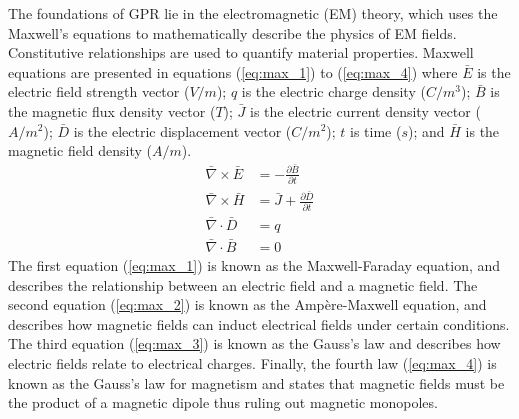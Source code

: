\documentclass{article}
\begin{document}
The foundations of GPR lie in the electromagnetic (EM) theory, which uses the Maxwell's equations to mathematically describe the physics of EM fields. Constitutive relationships are used to quantify material properties. Maxwell equations are presented in equations (\ref{eq:max_1}) to (\ref{eq:max_4}) where $\bar{E}$ is the electric field strength vector ($V/m$); $q$ is the electric charge density ($C/m^{3}$); $\bar{B}$ is the magnetic flux density vector ($T$); $\bar{J}$ is the electric current density vector ($A/m^{2}$); $\bar{D}$ is the electric displacement vector ($C/m^{2}$); $t$ is time ($s$); and $\bar{H}$ is the magnetic field density ($A/m$).
\begin{align}
    \bar{\nabla} \times \bar{E} &= - \frac{\partial \bar{B}}{\partial t} \label{eq:max_1} \\
    \bar{\nabla} \times \bar{H} &= \bar{J} + \frac{\partial \bar{D}}{\partial t} \label{eq:max_2} \\
    \bar{\nabla} \cdot \bar{D} &= q \label{eq:max_3} \\
    \bar{\nabla} \cdot \bar{B} &= 0 \label{eq:max_4}
\end{align}
The first equation (\ref{eq:max_1}) is known as the Maxwell-Faraday equation, and describes the relationship between an electric field and a magnetic field. The second equation (\ref{eq:max_2}) is known as the Ampère-Maxwell equation, and describes how magnetic fields can induct electrical fields under certain conditions. The third equation (\ref{eq:max_3}) is known as the Gauss's law and describes how electric fields relate to electrical charges. Finally, the fourth law (\ref{eq:max_4}) is known as the Gauss's law for magnetism and states that magnetic fields must be the product of a magnetic dipole thus ruling out magnetic monopoles.
\end{document}
